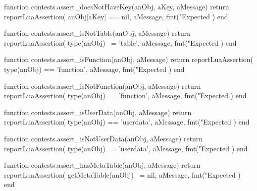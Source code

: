 \stopTestSuite


\startLuaCode
function contests.assert_doesNotHaveKey(anObj, aKey, aMessage)
  return reportLuaAssertion(
    anObj[aKey] == nil,
    aMessage,
    fmt("Expected %
  )
end
\stopLuaCode

\stopTestSuite


\startLuaCode
function contests.assert_isNotTable(anObj, aMessage)
  return reportLuaAssertion(
    type(anObj) ~= 'table',
    aMessage,
    fmt("Expected %
  )
end
\stopLuaCode

\stopTestSuite


\startLuaCode
function contests.assert_isFunction(anObj, aMessage)
  return reportLuaAssertion(
    type(anObj) == 'function',
    aMessage,
    fmt("Expected %
  )
end
\stopLuaCode

\stopTestSuite


\startLuaCode
function contests.assert_isNotFunction(anObj, aMessage)
  return reportLuaAssertion(
    type(anObj) ~= 'function',
    aMessage,
    fmt("Expected %
  )
end
\stopLuaCode

\stopTestSuite


\startLuaCode
function contests.assert_isUserData(anObj, aMessage)
  return reportLuaAssertion(
    type(anObj) == 'userdata',
    aMessage,
    fmt("Expected %
  )
end
\stopLuaCode

\stopTestSuite


\startLuaCode
function contests.assert_isNotUserData(anObj, aMessage)
  return reportLuaAssertion(
    type(anObj) ~= 'userdata',
    aMessage,
    fmt("Expected %
  )
end
\stopLuaCode

\stopTestSuite


\startLuaCode
function contests.assert_hasMetaTable(anObj, aMessage)
  return reportLuaAssertion(
    getMetaTable(anObj) ~= nil,
    aMessage,
    fmt("Expected %
  )
end
\stopLuaCode

